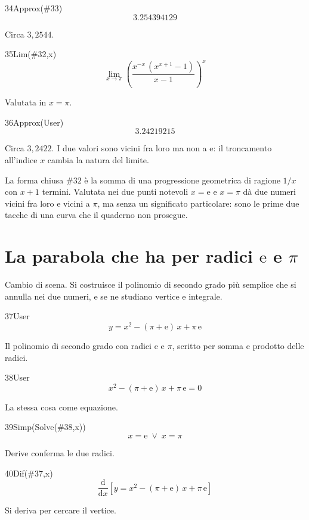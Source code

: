 \begin{espr}{34}{Approx(\#33)}{}
\[
3.254394129
\]
\end{espr}
Circa $3{,}2544$.

\begin{espr}{35}{Lim(\#32,x)}{}
\[
\lim_{x \to \pi} \left(\frac{x^{-x}\, \left(x^{x + 1} - 1\right)}{x - 1}\right)^{x}
\]
\end{espr}
Valutata in $x=\pi$.

\begin{espr}{36}{Approx(User)}{}
\[
3.24219215
\]
\end{espr}
Circa $3{,}2422$. I due valori sono vicini fra loro ma non a $\mathrm{e}$: il troncamento all'indice $x$ cambia la natura del limite.


La forma chiusa $\#32$ è la somma di una progressione geometrica di ragione $1/x$ con $x+1$ termini. Valutata nei due punti notevoli $x=\mathrm{e}$ e $x=\pi$ dà due numeri vicini fra loro e vicini a $\pi$, ma senza un significato particolare: sono le prime due tacche di una curva che il quaderno non prosegue.

\section{La parabola che ha per radici $\mathrm{e}$ e $\pi$}

Cambio di scena. Si costruisce il polinomio di secondo grado più semplice che si annulla nei due numeri, e se ne studiano vertice e integrale.

\begin{espr}{37}{User}{}
\[
y = x^{2} - \left(\pi + \mathrm{e}\right)\, x + \pi\, \mathrm{e}
\]
\end{espr}
Il polinomio di secondo grado con radici $\mathrm{e}$ e $\pi$, scritto per somma e prodotto delle radici.

\begin{espr}{38}{User}{}
\[
x^{2} - \left(\pi + \mathrm{e}\right)\, x + \pi\, \mathrm{e} = 0
\]
\end{espr}
La stessa cosa come equazione.

\begin{espr}{39}{Simp(Solve(\#38,x))}{}
\[
x = \mathrm{e} \;\lor\; x = \pi
\]
\end{espr}
Derive conferma le due radici.

\begin{espr}{40}{Dif(\#37,x)}{}
\[
\frac{\mathrm{d}}{\mathrm{d}x}\!\left[y = x^{2} - \left(\pi + \mathrm{e}\right)\, x + \pi\, \mathrm{e}\right]
\]
\end{espr}
Si deriva per cercare il vertice.

